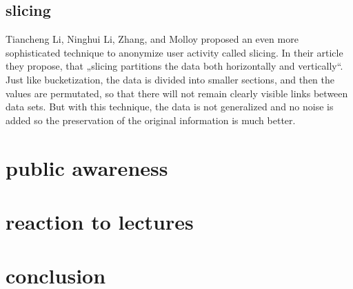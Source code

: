 \documentclass[10pt,a4paper,column]{article}
\begin{document}
\subsection{slicing} 
Tiancheng Li, Ninghui Li, Zhang, and Molloy proposed an even more sophisticated technique to anonymize user activity called slicing. In their article\cite{slicing} they propose, that „slicing partitions the data both horizontally and vertically“. Just like bucketization, the data is divided into smaller sections, and then the values are permutated, so that there will not remain clearly visible links between data sets. But with this technique, the data is not generalized and no noise is added so the preservation of the original information is much better. 
\section{public awareness} 
\section{reaction to lectures}
\section{conclusion} 





\end{document}
